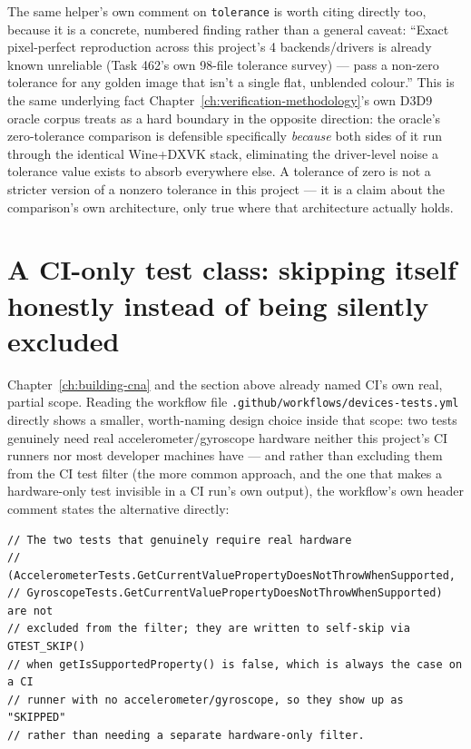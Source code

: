 The same helper's own comment on \texttt{tolerance} is worth citing directly too, because it
is a concrete, numbered finding rather than a general caveat: ``Exact pixel-perfect reproduction
across this project's 4 backends/drivers is already known unreliable (Task 462's own 98-file
tolerance survey) --- pass a non-zero tolerance for any golden image that isn't a single flat,
unblended colour.'' This is the same underlying fact Chapter~\ref{ch:verification-methodology}'s
own D3D9 oracle corpus treats as a hard boundary in the opposite direction: the oracle's
zero-tolerance comparison is defensible specifically \emph{because} both sides of it run through
the identical Wine+DXVK stack, eliminating the driver-level noise a tolerance value exists to
absorb everywhere else. A tolerance of zero is not a stricter version of a nonzero tolerance in
this project --- it is a claim about the comparison's own architecture, only true where that
architecture actually holds.

\section{A CI-only test class: skipping itself honestly instead of being silently excluded}

Chapter~\ref{ch:building-cna} and the section above already named CI's own real, partial scope.
Reading the workflow file
\texttt{.github/\allowbreak{}workflows/\allowbreak{}devices-tests.yml} directly shows a
smaller, worth-naming design choice inside that scope: two tests genuinely need real
accelerometer/gyroscope hardware neither this project's CI runners nor most developer
machines have --- and rather than
excluding them from the CI test filter (the more common approach, and the one that makes a
hardware-only test invisible in a CI run's own output), the workflow's own header comment
states the alternative directly:

\begin{lstlisting}
// The two tests that genuinely require real hardware
// (AccelerometerTests.GetCurrentValuePropertyDoesNotThrowWhenSupported,
// GyroscopeTests.GetCurrentValuePropertyDoesNotThrowWhenSupported) are not
// excluded from the filter; they are written to self-skip via GTEST_SKIP()
// when getIsSupportedProperty() is false, which is always the case on a CI
// runner with no accelerometer/gyroscope, so they show up as "SKIPPED"
// rather than needing a separate hardware-only filter.
\end{lstlisting}

